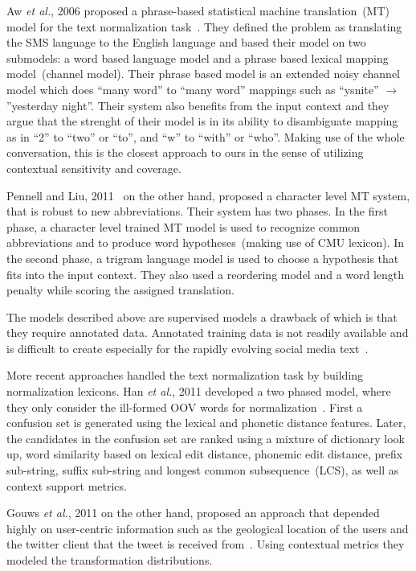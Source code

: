 \documentclass[a4paper,onesided,12pt]{report}
\begin{document}
Aw \textit{et al.}, 2006 proposed a phrase-based statistical machine translation~(MT) model for the text normalization task~\cite{Aw:2006:PSM:1273073.1273078}. They defined the problem as translating the SMS language to the English language and based their model on two submodels: a word based language model and a phrase based lexical mapping model~(channel model). Their phrase based model is an extended noisy channel model which does ``many word'' to ``many word'' mappings such as ``ysnite'' $\rightarrow$ ''yesterday night''. Their system also benefits from the input context and they argue that the strenght of their model is in its ability to disambiguate mapping as in ``2'' to ``two'' or ``to'', and ``w'' to ``with'' or ``who''. Making use of the whole conversation, this is the closest approach to ours in the sense of utilizing contextual sensitivity and coverage.

Pennell and Liu, 2011~\cite{pennell2011character} on the other hand, proposed a character level MT system, that is robust to new abbreviations. Their system has two phases. In the first phase, a character level trained MT model is used to recognize common abbreviations and to produce word hypotheses~(making use of CMU lexicon). In the second phase, a trigram language model is used to choose a hypothesis that fits into the input context. They also used a reordering model and a word length penalty while scoring the assigned translation.

The models described above are supervised models a drawback of which is that they require annotated data. Annotated training data is not readily available and is difficult to create especially for the rapidly evolving social media text~\cite{DBLP:conf/emnlp/YangE13}.

More recent approaches handled the text normalization task by building normalization lexicons. Han \textit{et al.}, 2011 developed a two phased model, where they only consider the ill-formed OOV words for normalization~\cite{Han:2011:LNS:2002472.2002520}. First a confusion set is generated using the lexical and phonetic distance features. Later, the candidates in the confusion set are ranked using a mixture of dictionary look up, word similarity based on lexical edit distance, phonemic edit distance, prefix sub-string, suffix sub-string and longest common subsequence~(LCS), as well as context support metrics.

Gouws \textit{et al.}, 2011 on the other hand, proposed an approach that depended highly on user-centric information such as the geological location of the users and the twitter client that the tweet is received from~\cite{Gouws:2011:CBL:2021109.2021113}. Using contextual metrics they modeled the transformation distributions.
\end{document}
